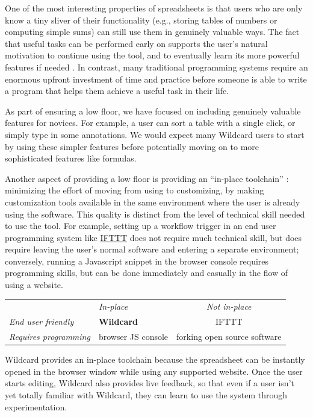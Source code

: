 \documentclass[english,submission]{programming}
\begin{document}
One of the most interesting properties of spreadsheets is that users who
are only know a tiny sliver of their functionality (e.g., storing tables
of numbers or computing simple sums) can still use them in genuinely
valuable ways. The fact that useful tasks can be performed early on
supports the user's natural motivation to continue using the tool, and
to eventually learn its more powerful features if needed
\autocite{nardi1991}. In contrast, many traditional programming systems
require an enormous upfront investment of time and practice before
someone is able to write a program that helps them achieve a useful task
in their life.

As part of ensuring a low floor, we have focused on including genuinely
valuable features for novices. For example, a user can sort a table with
a single click, or simply type in some annotations. We would expect many
Wildcard users to start by using these simpler features before
potentially moving on to more sophisticated features like formulas.

Another aspect of providing a low floor is providing an ``in-place
toolchain'' \autocite{inkandswitch2019}: minimizing the effort of moving
from using to customizing, by making customization tools available in
the same environment where the user is already using the software. This
quality is distinct from the level of technical skill needed to use the
tool. For example, setting up a workflow trigger in an end user
programming system like \href{https://ifttt.com/}{IFTTT} does not
require much technical skill, but does require leaving the user's normal
software and entering a separate environment; conversely, running a
Javascript snippet in the browser console requires programming skills,
but can be done immediately and casually in the flow of using a website.

\begin{longtable}[]{@{}llc@{}}
\toprule
\endhead
& \emph{In-place} & \emph{Not in-place}\tabularnewline
\emph{End user friendly} & \textbf{Wildcard} & IFTTT\tabularnewline
\emph{Requires programming} & browser JS console & forking open source
software\tabularnewline
\bottomrule
\end{longtable}

Wildcard provides an in-place toolchain because the spreadsheet can be
instantly opened in the browser window while using any supported
website. Once the user starts editing, Wildcard also provides live
feedback, so that even if a user isn't yet totally familiar with
Wildcard, they can learn to use the system through experimentation.
\end{document}
